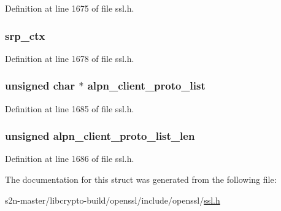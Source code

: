 Definition at line 1675 of file ssl.\+h.

\subsubsection[{\texorpdfstring{srp\+\_\+ctx}{srp_ctx}}]{ srp\+\_\+ctx}\hypertarget{structssl__st_ad3a544f7f1590f59a020f91dbd13ee09}{}\label{structssl__st_ad3a544f7f1590f59a020f91dbd13ee09}


Definition at line 1678 of file ssl.\+h.

\subsubsection[{\texorpdfstring{alpn\+\_\+client\+\_\+proto\+\_\+list}{alpn_client_proto_list}}]{\setlength{\rightskip}{0pt plus 5cm}unsigned char $\ast$ alpn\+\_\+client\+\_\+proto\+\_\+list}\hypertarget{structssl__st_a00a194ca684c082b9a17288427f3aff9}{}\label{structssl__st_a00a194ca684c082b9a17288427f3aff9}


Definition at line 1685 of file ssl.\+h.

\subsubsection[{\texorpdfstring{alpn\+\_\+client\+\_\+proto\+\_\+list\+\_\+len}{alpn_client_proto_list_len}}]{\setlength{\rightskip}{0pt plus 5cm}unsigned alpn\+\_\+client\+\_\+proto\+\_\+list\+\_\+len}\hypertarget{structssl__st_aad86abbbccbac1d4f14e4307727e3752}{}\label{structssl__st_aad86abbbccbac1d4f14e4307727e3752}


Definition at line 1686 of file ssl.\+h.



The documentation for this struct was generated from the following file\+:\begin{DoxyCompactItemize}
\item 
s2n-\/master/libcrypto-\/build/openssl/include/openssl/\hyperlink{include_2openssl_2ssl_8h}{ssl.\+h}\end{DoxyCompactItemize}
